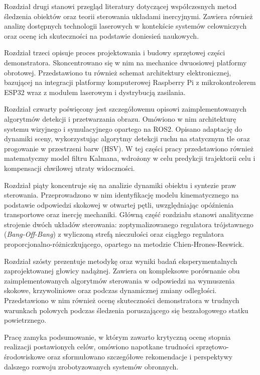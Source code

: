 \documentclass[a4paper,twoside,12pt]{book}
\begin{document}
Rozdział drugi stanowi przegląd literatury dotyczącej współczesnych metod śledzenia obiektów oraz teorii sterowania układami inercyjnymi. Zawiera również analizę dostępnych technologii laserowych w kontekście systemów celowniczych oraz ocenę ich skuteczności na podstawie doniesień naukowych.

Rozdział trzeci opisuje proces projektowania i budowy sprzętowej części demonstratora. Skoncentrowano się w nim na mechanice dwuosiowej platformy obrotowej. Przedstawiono tu również schemat architektury elektronicznej, bazującej na integracji platformy komputerowej Raspberry Pi z mikrokontrolerem ESP32 wraz z modułem laserowym i dystrybucją zasilania.

Rozdział czwarty poświęcony jest szczegółowemu opisowi zaimplementowanych algorytmów detekcji i przetwarzania obrazu. Omówiono w nim architekturę systemu wizyjnego i symulacyjnego opartego na ROS2. Opisano adaptację do dynamiki sceny, wykorzystując algorytmy detekcji ruchu na statycznym tle oraz progowanie w przestrzeni barw (HSV). W tej części pracy przedstawiono również matematyczny model filtru Kalmana, wdrożony w celu predykcji trajektorii celu i kompensacji chwilowej utraty widoczności.

Rozdział piąty koncentruje się na analizie dynamiki obiektu i syntezie praw sterowania. Przeprowadzono w nim identyfikację modelu kinematycznego na podstawie odpowiedzi skokowej w otwartej pętli, uwzględniając opóźnienia transportowe oraz inercję mechaniki. Główną część rozdziału stanowi analityczne strojenie dwóch układów sterowania: zoptymalizowanego regulatora trójstawnego (\textit{Bang-Off-Bang}) z wyliczoną strefą nieczułości oraz ciągłego regulatora proporcjonalno-różniczkującego, opartego na metodzie Chien-Hrones-Reswick.

Rozdział szósty prezentuje metodykę oraz wyniki badań eksperymentalnych zaprojektowanej głowicy nadążnej. Zawiera on kompleksowe porównanie obu zaimplementowanych algorytmów sterowania w odpowiedzi na wymuszenia skokowe, krzywoliniowe oraz podczas dynamicznej zmiany odległości. Przedstawiono w nim również ocenę skuteczności demonstratora w trudnych warunkach polowych podczas śledzenia poruszającego się bezzałogowego statku powietrznego.

Pracę zamyka podsumowanie, w którym zawarto krytyczną ocenę stopnia realizacji postawionych celów, omówiono napotkane trudności sprzętowo-środowiskowe oraz sformułowano szczegółowe rekomendacje i perspektywy dalszego rozwoju zrobotyzowanych systemów obronnych.
\end{document}
